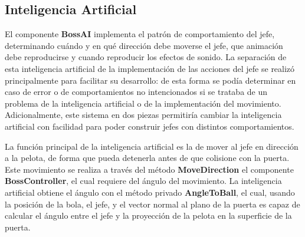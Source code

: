 \subsection{Inteligencia Artificial}
El componente \textbf{BossAI} implementa el patrón de comportamiento del jefe, determinando cuándo y en qué dirección debe moverse el jefe, que animación debe reproducirse y cuando reproducir los efectos de sonido. La separación de esta inteligencia artificial de la implementación de las acciones del jefe se realizó principalmente para facilitar su desarrollo: de esta forma se podía determinar en caso de error o de comportamientos no intencionados si se trataba de un problema de la inteligencia artificial o de la implementación del movimiento. Adicionalmente, este sistema en dos piezas permitiría cambiar la inteligencia artificial con facilidad para poder construir jefes con distintos comportamientos.

La función principal de la inteligencia artificial es la de mover al jefe en dirección a la pelota, de forma que pueda detenerla antes de que colisione con la puerta. Este movimiento se realiza a través del método \textbf{MoveDirection} el componente \textbf{BossController}, el cual requiere del ángulo del movimiento. La inteligencia artificial obtiene el ángulo con el método privado \textbf{AngleToBall}, el cual, usando la posición de la bola, el jefe, y el vector normal al plano de la puerta es capaz de calcular el ángulo entre el jefe y la proyección de la pelota en la superficie de la puerta.

